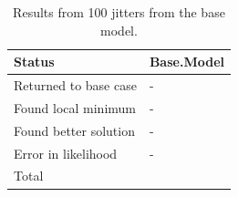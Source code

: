 \documentclass[12pt,]{article}
\begin{document}
\newpage

\begin{table}[ht]
\centering
\caption{Results from 100 jitters from the base model.} 
\label{tab:jitter}
\begin{tabular}{>{\centering}p{2in}>{\centering}p{1in}}
  \hline
Status & Base.Model \\ 
  \hline
Returned to base case & - \\ 
  Found local minimum & - \\ 
  Found better solution & - \\ 
  Error in likelihood & - \\ 
  Total & 100 \\ 
   \hline
\end{tabular}
\end{table}

\FloatBarrier

\newpage
\end{document}
